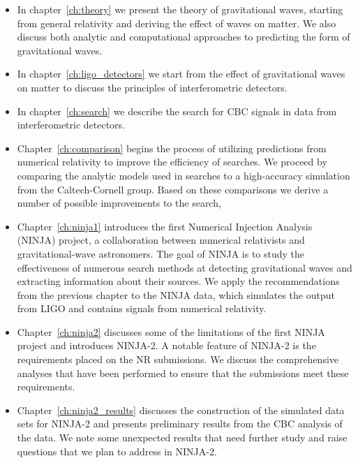 \begin{itemize}

\item In chapter~\ref{ch:theory} we present the theory of
gravitational waves, starting from general relativity and deriving
the effect of waves on matter.  We also discuss both analytic and
computational approaches to predicting the form of gravitational
waves.

\item In chapter~\ref{ch:ligo_detectors} we start from the effect of
gravitational waves on matter to discuss the principles of
interferometric detectors. 

\item In chapter~\ref{ch:search} we describe the search for CBC
signals in data from interferometric detectors.

\item Chapter~\ref{ch:comparison} begins the process of utilizing
predictions from numerical relativity to improve the efficiency of
searches.  We proceed by comparing the analytic models used in
searches to a high-accuracy simulation from the Caltech-Cornell group.
Based on these comparisons we derive a number of possible improvements
to the search,

\item Chapter~\ref{ch:ninja1} introduces the first Numerical Injection
Analysis (NINJA) project, a collaboration between numerical
relativists and gravitational-wave astronomers.  The goal of NINJA is
to study the effectiveness of numerous search methods at detecting
gravitational waves and extracting information about their sources.
We apply the recommendations from the previous chapter to the NINJA
data, which simulates the output from LIGO and contains signals from
numerical relativity.

\item Chapter~\ref{ch:ninja2} discusses some of the limitations of the
first NINJA project and introduces NINJA-2.  A notable feature of
NINJA-2 is the requirements placed on the NR submissions.  We discuss 
the comprehensive analyses that have been performed to ensure that the
submissions meet these requirements.

\item Chapter~\ref{ch:ninja2_results} discusses the construction of the
simulated data sets for NINJA-2 and presents preliminary results from
the CBC analysis of the data.  We note some unexpected results that
need further study and raise questions that we plan to address in
NINJA-2.


\end{itemize}
